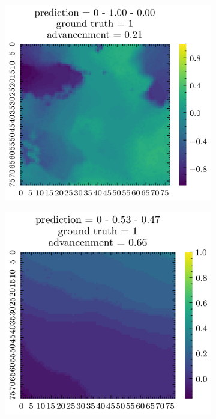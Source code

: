 \documentclass[../document.tex]{subfiles}
\begin{document}
\begin{figure}[H]
\begin{subfigure}[b]{0.19\textwidth}
    \end{subfigure}  
    \begin{subfigure}[b]{0.19\textwidth}
        \includegraphics[width=\linewidth]{../img/5/quarry/false_positive/patch-2d-2.png}
    \end{subfigure}
    \begin{subfigure}[b]{0.19\textwidth}
        \includegraphics[width=\linewidth]{../img/5/quarry/false_positive/patch-2d-3.png}

\end{subfigure}
\end{figure}
\end{document}
